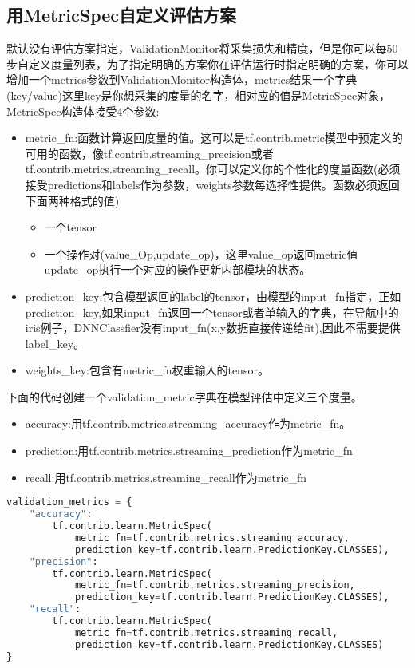 \subsection{用MetricSpec自定义评估方案}
默认没有评估方案指定，ValidationMonitor将采集损失和精度，但是你可以每50步自定义度量列表，为了指定明确的方案你在评估运行时指定明确的方案，你可以增加一个metrics参数到ValidationMonitor构造体，metrics结果一个字典(key/value)这里key是你想采集的度量的名字，相对应的值是MetricSpec对象，MetricSpec构造体接受4个参数:
\begin{itemize}
  \item metric\_fn:函数计算返回度量的值。这可以是tf.contrib.metric模型中预定义的可用的函数，像tf.contrib.streaming\_precision或者tf.contrib.metrics.streaming\_recall。你可以定义你的个性化的度量函数(必须接受predictions和labels作为参数，weights参数每选择性提供。函数必须返回下面两种格式的值)
  \begin{itemize}
    \item 一个tensor
    \item 一个操作对(value\_Op,update\_op)，这里value\_op返回metric值update\_op执行一个对应的操作更新内部模块的状态。
  \end{itemize}
  \item prediction\_key:包含模型返回的label的tensor，由模型的input\_fn指定，正如prediction\_key,如果input\_fn返回一个tensor或者单输入的字典，在导航中的iris例子，DNNClassfier没有input\_fn(x,y数据直接传递给fit),因此不需要提供label\_key。
  \item weights\_key:包含有metric\_fn权重输入的tensor。
\end{itemize}
下面的代码创建一个validation\_metric字典在模型评估中定义三个度量。
\begin{itemize}
  \item accuracy:用tf.contrib.metrics.streaming\_accuracy作为metric\_fn。
  \item prediction:用tf.contrib.metrics.streaming\_prediction作为metric\_fn
  \item recall:用tf.contrib.metrics.streaming\_recall作为metric\_fn
\end{itemize}
\begin{lstlisting}[language=Python]
validation_metrics = {
    "accuracy":
        tf.contrib.learn.MetricSpec(
            metric_fn=tf.contrib.metrics.streaming_accuracy,
            prediction_key=tf.contrib.learn.PredictionKey.CLASSES),
    "precision":
        tf.contrib.learn.MetricSpec(
            metric_fn=tf.contrib.metrics.streaming_precision,
            prediction_key=tf.contrib.learn.PredictionKey.CLASSES),
    "recall":
        tf.contrib.learn.MetricSpec(
            metric_fn=tf.contrib.metrics.streaming_recall,
            prediction_key=tf.contrib.learn.PredictionKey.CLASSES)
}
\end{lstlisting}
